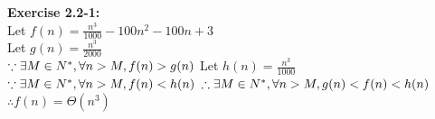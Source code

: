 \documentclass{article}
\begin{document}
\begin{spacing}{2.0}
\noindent
\textbf{Exercise 2.2-1:}\\
Let $f(n) = \frac{n ^ 3}{1000} - 100 n ^ 2 - 100 n + 3$\\
Let $g(n) = \frac{n ^ 3}{2000}$\\
$\because \exists M \in N^*, \forall n > M,  f(n) > g(n)\\$
Let $h(n) = \frac{n ^ 3}{1000}$\\
$\because \exists M \in N^*, \forall n > M,  f(n) < h(n)\\$
$\therefore \exists M \in N^*, \forall n > M, g(n) < f(n) < h(n)\\$
$\therefore f(n) = \Theta(n ^ 3)$\\
\end{spacing}
\end{document}
